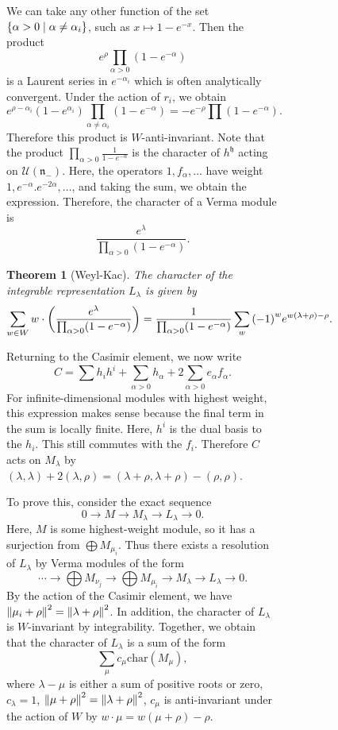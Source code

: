\documentclass[leqno, openany]{memoir}
\newtheorem{thm}{Theorem}[section]
\theoremstyle{definition}
\theoremstyle{remark}
\theoremstyle{plain}
\theoremstyle{definition}
\theoremstyle{remark}
\newcommand{\mc}[1]{\mathcal{#1}}
\newcommand{\mf}[1]{\mathfrak{#1}}
\newcommand{\mr}[1]{\mathrm{#1}}
\begin{document}
\begin{figure}[H]
\begin{figure}[H]
We can take any other function of the set $\qty{\alpha > 0 \mid \alpha \neq
\alpha_i}$, such as $x \mapsto 1-e^{-x}$. Then the product \[ e^{\rho}
\prod_{\alpha > 0} (1-e^{-\alpha}) \] is a Laurent series in $e^{-\alpha_i}$
which is often analytically convergent. Under the action of $r_i$, we obtain \[
e^{\rho-\alpha_i} (1-e^{\alpha_i}) \prod_{\alpha \neq \alpha_i} (1-e^{-\alpha})
= -e^{-\rho} \prod (1-e^{-\alpha}). \] Therefore this product is
$W$-anti-invariant. Note that the product $\prod_{\alpha >0}
\frac{1}{1-e^{-\alpha}}$ is the character of $h^{\mf{h}}$ acting on
$\mc{U}(\mf{n}_-)$. Here, the operators $1, f_{\alpha}, \ldots$ have weight
$1,e^{-\alpha}. e^{-2\alpha},\ldots$, and taking the sum, we obtain the
expression. Therefore, the character of a Verma module is \[
\frac{e^{\lambda}}{\prod_{\alpha > 0} (1-e^{-\alpha})}. \]

\begin{thm}[Weyl-Kac] The character of the integrable representation
    $L_{\lambda}$ is given by \[ \sum_{w \in W} w \cdot
    \qty(\frac{e^{\lambda}}{\prod_{\alpha > 0} (1-e^{-\alpha})}) =
\frac{1}{\prod_{\alpha > 0}(1-e^{-\alpha})} \sum_w {(-1)}^w e^{w(\lambda +
\rho) - \rho}. \] \end{thm}

Returning to the Casimir element, we now write \[ C = \sum h_i h^i +
\sum_{\alpha > 0} h_{\alpha} + 2 \sum_{\alpha > 0} e_{\alpha} f_{\alpha}. \]
For infinite-dimensional modules with highest weight, this expression makes
sense because the final term in the sum is locally finite. Here, $h^i$ is the
dual basis to the $h_i$. This still commutes with the $f_i$. Therefore $C$ acts
on $M_{\lambda}$ by $(\lambda, \lambda) + 2 (\lambda, \rho) = (\lambda + \rho,
\lambda + \rho) - (\rho, \rho)$.

To prove this, consider the exact sequence \[ 0 \to M \to M_{\lambda} \to
L_{\lambda} \to 0. \] Here, $M$ is some highest-weight module, so it has a
surjection from $\bigoplus M_{\mu_i}$. Thus there exists a resolution of
$L_{\lambda}$ by Verma modules of the form \[ \cdots \to \bigoplus M_{\nu_j}
\to \bigoplus M_{\mu_i} \to M_{\lambda} \to L_{\lambda} \to 0. \] By the action
of the Casimir element, we have $\norm{\mu_i + \rho}^2 = \norm{\lambda +
\rho}^2$. In addition, the character of $L_{\lambda}$ is $W$-invariant by
integrability. Together, we obtain that the character of $L_{\lambda}$ is a sum
of the form \[ \sum_{\mu} c_{\mu} \mr{char}(M_{\mu}), \] where $\lambda - \mu$
is either a sum of positive roots or zero, $c_{\lambda} = 1$, $\norm{\mu +
\rho}^2 = \norm{\lambda + \rho}^2$, $c_{\mu}$ is anti-invariant under the
action of $W$ by $w \cdot \mu = w(\mu +\rho)-\rho$.


\end{figure}
\end{figure}
\end{document}

